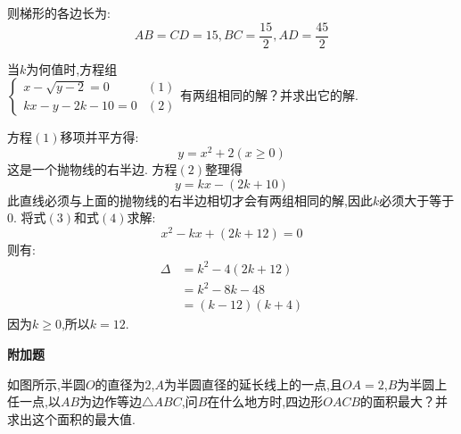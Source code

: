 \begin{questions}
\begin{solution}
		则梯形的各边长为:
		\begin{equation*}
			AB = CD = 15, BC = \frac{15}{2}, AD = \frac{45}{2}
		\end{equation*}
	\end{solution}

	\question 当$k$为何值时,方程组 \begin{math}
		\left\{
		\begin{array}{lr}
			x - \sqrt{y - 2} = 0 & (1) \\
			kx - y - 2k - 10 = 0 & (2)
		\end{array}
		\right. 有两组相同的解？并求出它的解.
	\end{math}

	\begin{solution}
		方程$(1)$移项并平方得:
		\begin{equation*}
			y=x^2 + 2 (x \geqslant 0) \tag{3}
		\end{equation*}
		这是一个抛物线的右半边.
		方程$(2)$整理得
		\begin{equation*}
			y=kx - (2k + 10) \tag{4}
		\end{equation*}
		此直线必须与上面的抛物线的右半边相切才会有两组相同的解,因此$k$必须大于等于0.
		将式$(3)$和式$(4)$求解:
		\begin{equation*}
			x^2 - kx + (2k + 12) = 0
		\end{equation*}
		则有:
		\begin{align*}
			\Delta & = k^2 - 4(2k + 12) \\
			       & = k^2 - 8k - 48    \\
			       & = (k-12)(k+4)
		\end{align*}
		因为$k\geqslant 0$,所以$k=12$.
	\end{solution}

	\begin{center}
		\textbf{附加题}
	\end{center}

	\question
	如图所示,半圆$O$的直径为$2$,$A$为半圆直径的延长线上的一点,且$OA=2$,$B$为半圆上任一点,以$AB$为边作等边$\triangle{ABC}$,问$B$在什么地方时,四边形$OACB$的面积最大？并求出这个面积的最大值.
	\begin{figure*}[ht]
		\centering
\end{figure*}
\end{questions}
